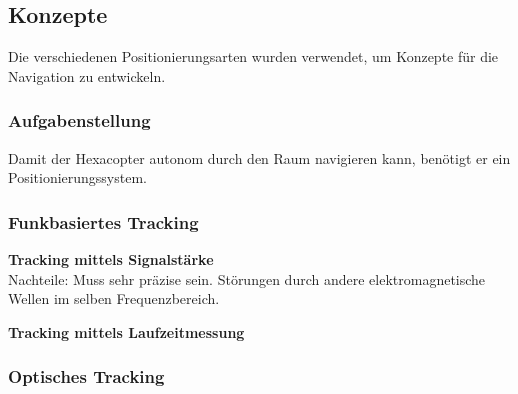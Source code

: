   \subsection{Konzepte}
  Die verschiedenen Positionierungsarten wurden verwendet, um Konzepte für die Navigation zu entwickeln.

    \subsubsection{Aufgabenstellung}
    Damit der Hexacopter autonom durch den Raum navigieren kann, benötigt er ein Positionierungssystem.

    \subsubsection{Funkbasiertes Tracking}

      \textbf{Tracking mittels Signalstärke}\\


      Nachteile: 
      Muss sehr präzise sein.
      Störungen durch andere elektromagnetische Wellen im selben Frequenzbereich.

      

      \textbf{Tracking mittels Laufzeitmessung}\\





    \subsubsection{Optisches Tracking}


